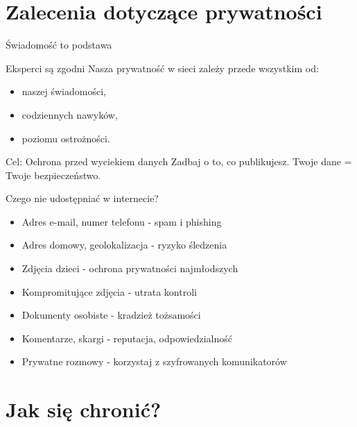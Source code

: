 \section{Zalecenia dotyczące prywatności}

\begin{frame}{Świadomość to podstawa}
\begin{alertblock}{Eksperci są zgodni}
Nasza prywatność w sieci zależy przede wszystkim od:
\begin{itemize}
    \item naszej świadomości,
    \item codziennych nawyków,
    \item poziomu ostrożności.
\end{itemize}
\end{alertblock}
\pause
\begin{exampleblock}{Cel: Ochrona przed wyciekiem danych}
Zadbaj o to, co publikujesz. Twoje dane = Twoje bezpieczeństwo.
\end{exampleblock}
\end{frame}

\begin{frame}{Czego nie udostępniać w internecie?}
\begin{itemize}
    \item Adres e-mail, numer telefonu - spam i phishing
    \item Adres domowy, geolokalizacja - ryzyko śledzenia
    \item Zdjęcia dzieci - ochrona prywatności najmłodszych
    \item Kompromitujące zdjęcia - utrata kontroli
    \item Dokumenty osobiste - kradzież tożsamości
    \item Komentarze, skargi - reputacja, odpowiedzialność
    \item Prywatne rozmowy - korzystaj z szyfrowanych komunikatorów \cite{czegoNieUdostepniac}
\end{itemize}
\end{frame}

\section{Jak się chronić?}

